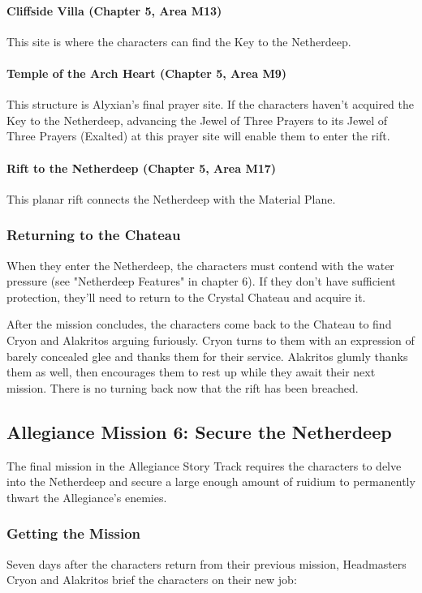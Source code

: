 \documentclass[10pt,a4paper,twoside,twocolumn,openany,nodeprecatedcode]{dndbook}
\begin{document}
\paragraph{Cliffside Villa (Chapter 5, Area M13)}
This site is where the characters can find the Key to the Netherdeep.

\paragraph{Temple of the Arch Heart (Chapter 5, Area M9)}
This structure is Alyxian's final prayer site. If the characters haven't acquired the Key to the Netherdeep, advancing the Jewel of Three Prayers to its Jewel of Three Prayers (Exalted) at this prayer site will enable them to enter the rift.

\paragraph{Rift to the Netherdeep (Chapter 5, Area M17)}
This planar rift connects the Netherdeep with the Material Plane.

\subsubsection{Returning to the Chateau}
When they enter the Netherdeep, the characters must contend with the water pressure (see "Netherdeep Features" in chapter 6). If they don't have sufficient protection, they'll need to return to the Crystal Chateau and acquire it.

After the mission concludes, the characters come back to the Chateau to find Cryon and Alakritos arguing furiously. Cryon turns to them with an expression of barely concealed glee and thanks them for their service. Alakritos glumly thanks them as well, then encourages them to rest up while they await their next mission. There is no turning back now that the rift has been breached.

\subsection{Allegiance Mission 6: Secure the Netherdeep}
The final mission in the Allegiance Story Track requires the characters to delve into the Netherdeep and secure a large enough amount of ruidium to permanently thwart the Allegiance's enemies.

\subsubsection{Getting the Mission}
Seven days after the characters return from their previous mission, Headmasters Cryon and Alakritos brief the characters on their new job:
\end{document}
